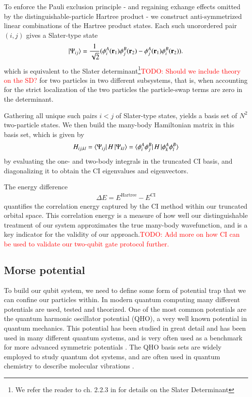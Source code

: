 \documentclass{subfiles}
\begin{document}
To enforce the Pauli exclusion principle - and regaining exhange effects omitted by the distinguishable-particle Hartree product - we construct anti-symmetrized linear combinations of the Hartree product states. Each such unorordered pair $(i,j)$ gives a Slater-type state
\begin{align*}
    \ket{\Psi_{ij}} = \frac{1}{\sqrt{2}}(\phi_i^A(\mathbf{r}_1)\phi_j^B(\mathbf{r}_2) - \phi_j^A(\mathbf{r}_1)\phi_i^B(\mathbf{r}_2)).
\end{align*}
which is equivalent to the Slater determinant\footnote{We refer the reader to ch. 2.2.3 in \cite{szabo1996modern} for details on the Slater Determinant}\textcolor{red}{TODO: Should we include theory on the SD?} for two particles in two different subsystems, that is, when accounting for the strict localization of the two particles the particle-swap terms are zero in the determinant. 

Gathering all unique such pairs $i<j$ of Slater-type states, yields a basis set of $N^2$ two-particle states. We then build the many-body Hamiltonian matrix in this basis set, which is given by
\begin{align*}
    H_{ij,kl} = \bra{\Psi_{ij}}H\ket{\Psi_{kl}} = \bra{\phi_i^A\phi_j^B}H\ket{\phi_k^A\phi_l^B}
\end{align*}
by evaluating the one- and two-body integrals in the truncated CI basis, and diagonalizing it to obtain the CI eigenvalues and eigenvectors. 

The energy difference
\begin{align*}
    \Delta E = E^{\text{Hartree}} - E^{\text{CI}}
\end{align*}
quantifies the correlation energy captured by the CI method within our truncated orbital space. This correlation energy is a measure of how well our distinguishable treatment of our system approximates the true many-body wavefunction, and is a key indicator for the validity of our approach.\textcolor{red}{TODO: Add more on how CI can be used to validate our two-qubit gate protocol further.}


\subsection{Morse potential}\label{sec:morse_potential}
To build our qubit system, we need to define some form of potential trap that we can confine our particles within. In modern quantum computing many different potentials are used, tested and theorized. One of the most common potentials are the quantum harmonic oscillator potential (QHO), a very well known potential in quantum mechanics. This potential has been studied in great detail and has been used in many different quantum systems, and is very often used as a benchmark for more advanced symmetric potentials \cite{griffiths2018introduction, berera2021quantum}. The QHO basis sets are widely employed to study quantum dot systems\cite{Yuan_2017}, and are often used in quantum chemistry to describe molecular vibrations \cite{atkins2011molecular}. 
\\ 
\end{document}
